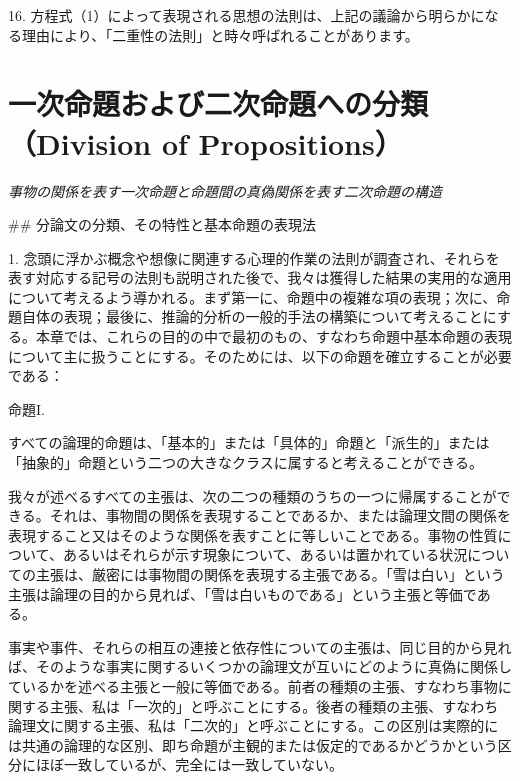 \documentclass[a4paper,11pt,openany]{ltjsbook}
\begin{document}
16. 方程式（1）によって表現される思想の法則は、上記の議論から明らかになる理由により、「二重性の法則」と時々呼ばれることがあります。

\newpage

\chapter{一次命題および二次命題への分類（Division of Propositions）}
\label{ch:iv}

\begin{center}
\large\textit{事物の関係を表す一次命題と命題間の真偽関係を表す二次命題の構造}
\end{center}
\vspace{4mm}

\#\# 分論文の分類、その特性と基本命題の表現法

1. 念頭に浮かぶ概念や想像に関連する心理的作業の法則が調査され、それらを表す対応する記号の法則も説明された後で、我々は獲得した結果の実用的な適用について考えるよう導かれる。まず第一に、命題中の複雑な項の表現；次に、命題自体の表現；最後に、推論的分析の一般的手法の構築について考えることにする。本章では、これらの目的の中で最初のもの、すなわち命題中基本命題の表現について主に扱うことにする。そのためには、以下の命題を確立することが必要である：

\begin{center}
\textsc{命題I.}
\end{center}

すべての論理的命題は、「基本的」または「具体的」命題と「派生的」または「抽象的」命題という二つの大きなクラスに属すると考えることができる。

我々が述べるすべての主張は、次の二つの種類のうちの一つに帰属することができる。それは、事物間の関係を表現することであるか、または論理文間の関係を表現すること又はそのような関係を表すことに等しいことである。事物の性質について、あるいはそれらが示す現象について、あるいは置かれている状況についての主張は、厳密には事物間の関係を表現する主張である。「雪は白い」という主張は論理の目的から見れば、「雪は白いものである」という主張と等価である。

事実や事件、それらの相互の連接と依存性についての主張は、同じ目的から見れば、そのような事実に関するいくつかの論理文が互いにどのように真偽に関係しているかを述べる主張と一般に等価である。前者の種類の主張、すなわち事物に関する主張、私は「一次的」と呼ぶことにする。後者の種類の主張、すなわち論理文に関する主張、私は「二次的」と呼ぶことにする。この区別は実際的には共通の論理的な区別、即ち命題が主観的または仮定的であるかどうかという区分にほぼ一致しているが、完全には一致していない。
\end{document}
